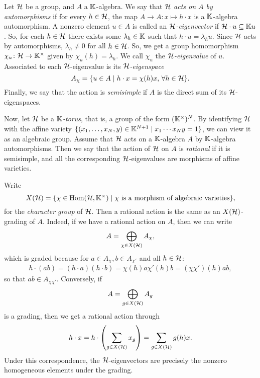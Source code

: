 Let $\mathcal{H}$ be a group, and $A$ a $\mathbb{K}$-algebra. We say that $\mathcal{H}$ \emph{acts on $A$
	by automorphisms} if for every $h \in \mathcal{H}$, the map $A
	\to A \colon x \mapsto h \cdot x$ is a $\mathbb{K}$-algebra automorphism. A nonzero element
$u \in A$ is called an \emph{$\mathcal{H}$-eigenvector} if $\mathcal{H}
	\cdot u \subseteq \mathbb{K} u$. So, for each $h \in \mathcal{H}$ there exists some $\lambda_h \in
	\mathbb{K}$ such that $h \cdot u = \lambda_h u$. Since $\mathcal{H}$ acts by automorphisms,
$\lambda_h \neq 0$ for all $h \in \mathcal{H}$. So, we get a group homomorphism $\chi_u \colon
	\mathcal{H} \to \mathbb{K}^\times$ given by $\chi_u(h) = \lambda_h$. We call $\chi_u$ the \emph{$\mathcal{H}$-eigenvalue} of $u$. Associated
to each $\mathcal{H}$-eigenvalue is its \emph{$\mathcal{H}$-eigenspace}
\begin{equation*}
	A_\chi = \{u \in A \mid h \cdot x = \chi(h)x,\, \forall h \in \mathcal{H} \}.
\end{equation*}
%
Finally, we say that the action is \emph{semisimple} if $A$ is
the direct sum of its $\mathcal{H}$-eigenspaces.

Now, let $\mathcal{H}$ be a \emph{$\mathbb{K}$-torus}, that is, a group of the form
$(\mathbb{K}^\times)^N$. By identifying $\mathcal{H}$ with the affine variety $\{(x_1, \dots, x_N,
	y) \in \mathbb{K}^{N+1} \mid x_1 \cdots x_N y = 1\}$, we can view it as an algebraic group.
Assume that $\mathcal{H}$ acts on a $\mathbb{K}$-algebra $A$ by $\mathbb{K}$-algebra automorphisms. Then
we say that the action of $\mathcal{H}$ on $A$ is \emph{rational} if it
is semisimple, and all the corresponding $\mathcal{H}$-eigenvalues are morphisms of affine
varieties.

Write
\begin{equation*}
	X(\mathcal{H}) = \{\chi \in \operatorname{Hom}(\mathcal{H}, \mathbb{K}^\times) \mid \chi \text{ is a morphism of algebraic varieties}\},
\end{equation*}
%
for the \emph{character group} of $\mathcal{H}$. Then a rational action
is the same as an $X(\mathcal{H})$-grading of $A$. Indeed, if we have a
rational action on $A$, then we can write
\begin{equation*}
	A = \bigoplus_{\chi \in X(\mathcal{H})} A_\chi,
\end{equation*}
which is graded because for $a \in A_\chi, b \in A_{\chi'}$ and all $h \in \mathcal{H}$:
\begin{align*}
	h \cdot (a b) = (h\cdot a)(h\cdot b)= \chi(h)a \chi'(h)b = (\chi \chi')(h)ab,
\end{align*}
so that $ab \in A_{\chi \chi'}$. Conversely, if
\begin{equation*}
	A = \bigoplus_{g \in X(\mathcal{H})} A_g
\end{equation*}
is a grading, then we get a rational action through
\begin{equation*}
	h \cdot x = h \cdot \left(\sum_{g \in X(\mathcal{H})} x_g \right) = \sum_{g \in X(\mathcal{H})} g(h)x.
\end{equation*}
%
Under this correspondence, the $\mathcal{H}$-eigenvectors are precisely the nonzero
homogeneous elements under the grading.

